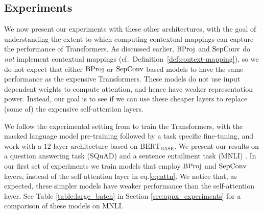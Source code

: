 \documentclass{article} %
\newcommand{\BB}{\text{BERT}_{\text{BASE}}}
\begin{document}

\vspace*{-5pt}
\subsection{Experiments}
\vspace*{-3pt}

We now present our experiments with these other architectures, with the goal of understanding the extent to which computing contextual mappings can capture the performance of Transformers. As discussed earlier, ${\rm BProj}$ and ${\rm SepConv}$ do \emph{not} implement contextual mappings (cf.~Definition~\ref{def:context-mapping}), so we do not expect that either ${\rm BProj}$ or ${\rm SepConv}$ based models to have the same performance as the expensive Transformers. These models do not use input dependent weights to compute attention, and hence have weaker representation power. Instead, our goal is to see if we can use these cheaper layers to replace (some of) the expensive self-attention layers.



We follow the experimental setting from \citet{devlin2018bert} to train the Transformers, with the masked language model pre-training followed by a task specific fine-tuning, and work with a $12$ layer architecture based on $\BB$. We present our results on a question answering task (SQuAD) \citep{rajpurkar2016squad} and a sentence entailment task (MNLI) \citep{mnli}. In our first set of experiments we train models that employ ${\rm BProj}$ and ${\rm SepConv}$ layers, instead of the self-attention layer in eq.\eqref{eq:attn}. We notice that, as expected, these simpler models have weaker performance than the self-attention layer. See Table \ref{table:large_batch} in Section \ref{sec:appx_experiments} for a comparison of these models on MNLI. 

\end{document}
